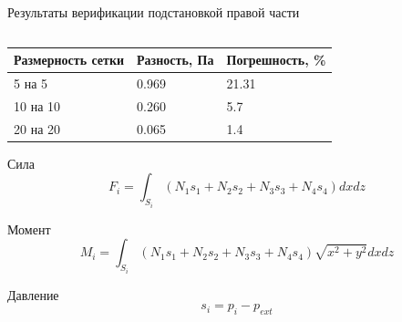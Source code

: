 \documentclass[ignoreonframetext,unicode]{beamer}
\begin{document}
\begin{frame}{Результаты верификации подстановкой правой части}
\begin{columns}
	\end{columns}

	\vspace*{-3mm}
\begin{table}[!htbp]
	\begin{tabular}{|l|l|l|}
		\hline
		\multicolumn{1}{|c|}{Размерность сетки} & \multicolumn{1}{c|}{Разность, Па} & Погрешность, \% \\ \hline
		5 на 5                                  & 0.969                              & 21.31            \\ \hline
		10 на 10                                & 0.260                              & 5.7            \\ \hline
		20 на 20                                & 0.065                              & 1.4            \\ \hline
	\end{tabular}
\end{table}
\end{frame}

\begin{frame}
		\vspace*{-2mm}
	\begin{block}{Сила}
		\begin{equation*}
			F_i = \int_{S_i} { \left( N_1 s_1 + N_2 s_2 + N_3 s_3 + N_4 s_4 \right)  dx dz}
		\end{equation*}
	\end{block}
	
	\vspace*{-2mm}
	\begin{block}{Момент}
		\begin{equation*}
			M_i = \int_{S_i} { \left( N_1 s_1 + N_2 s_2 + N_3 s_3 + N_4 s_4 \right) \sqrt{x^2 + y^2}  dx dz}
		\end{equation*}
	\end{block}

		\begin{block}{Давление}
	\vspace*{2mm}
	\begin{equation*}
		s_i = p_i - p_{ext}
		\label{kjdsbafabjb}
	\end{equation*}
\end{block}
\end{frame}
\end{document}
